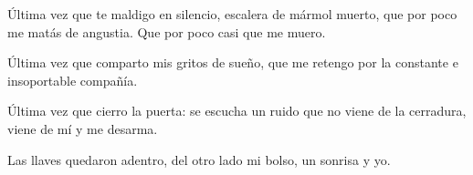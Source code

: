 
Última vez que te maldigo en silencio, escalera de mármol muerto, que por poco
me matás de angustia. Que por poco casi que me muero.

Última vez que comparto mis gritos de sueño, que me retengo por la constante
e insoportable compañía.

Última vez que cierro la puerta: se escucha un ruido que no viene de la
cerradura, viene de mí y me desarma.

Las llaves quedaron adentro, del otro lado mi bolso, un sonrisa y yo.

